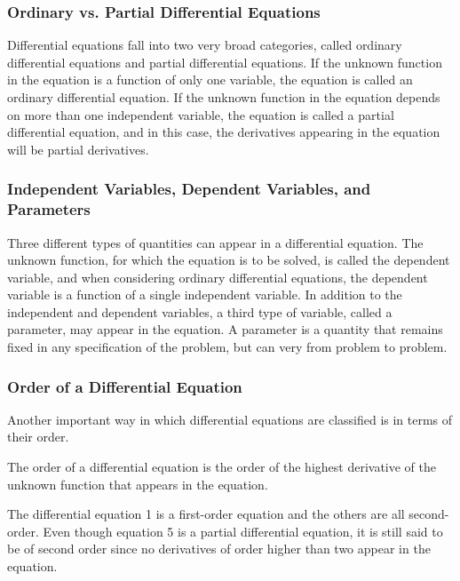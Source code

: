   \subsubsection{Ordinary vs. Partial Differential Equations}

    Differential equations fall into two very broad categories, called ordinary differential equations and partial differential equations. If the unknown function in the equation is a function of only one variable, the equation is called an ordinary differential equation. If the unknown function in the equation depends on more than one independent variable, the equation is called a partial differential equation, and in this case, the derivatives appearing in the equation will be partial derivatives.

  \subsubsection{Independent Variables, Dependent Variables, and Parameters}

   Three different types of quantities can appear in a differential equation. The unknown function, for which the equation is to be solved, is called the dependent variable, and when considering ordinary differential equations, the dependent variable is a function of a single independent variable. In addition to the independent and dependent variables, a third type of variable, called a parameter, may appear in the equation. A parameter is a quantity that remains fixed in any specification of the problem, but can very from problem to problem.
  
  \subsubsection{Order of a Differential Equation}

    Another important way in which differential equations are classified is in terms of their order.

    \begin{definition}
      The order of a differential equation is the order of the highest derivative of the unknown function that appears in the equation.
    \end{definition}

    The differential equation 1 is a first-order equation and the others are all second-order. Even though equation 5 is a partial differential equation, it is still said to be of second order since no derivatives of order higher than two appear in the equation.

